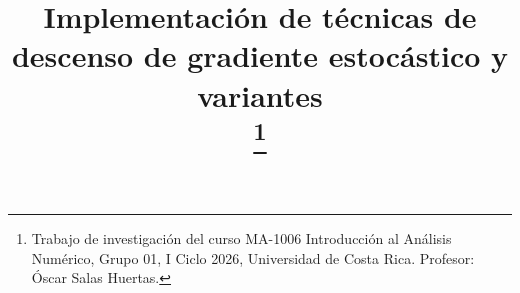 \documentclass[conference]{IEEEtran}
\begin{document}


\title{Implementación de técnicas de descenso de gradiente estocástico y variantes\\
\thanks{Trabajo de investigación del curso MA-1006 Introducción al Análisis Numérico, Grupo 01, I Ciclo 2026, Universidad de Costa Rica. Profesor: Óscar Salas Huertas.}
}

\author{
}

\maketitle














\end{document}
